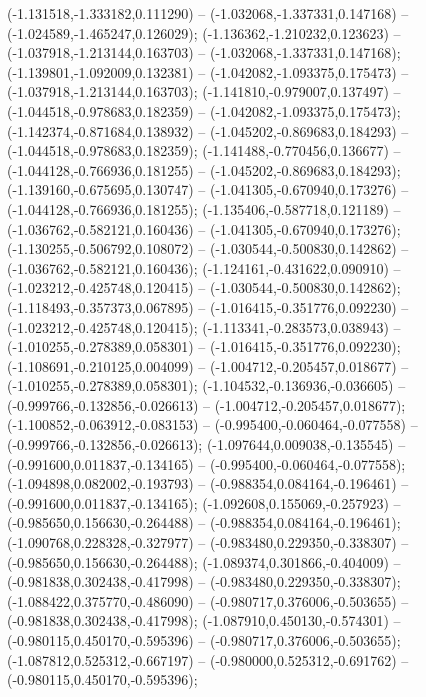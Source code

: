  (-1.131518,-1.333182,0.111290) -- (-1.032068,-1.337331,0.147168) -- (-1.024589,-1.465247,0.126029);
 (-1.136362,-1.210232,0.123623) -- (-1.037918,-1.213144,0.163703) -- (-1.032068,-1.337331,0.147168);
 (-1.139801,-1.092009,0.132381) -- (-1.042082,-1.093375,0.175473) -- (-1.037918,-1.213144,0.163703);
 (-1.141810,-0.979007,0.137497) -- (-1.044518,-0.978683,0.182359) -- (-1.042082,-1.093375,0.175473);
 (-1.142374,-0.871684,0.138932) -- (-1.045202,-0.869683,0.184293) -- (-1.044518,-0.978683,0.182359);
 (-1.141488,-0.770456,0.136677) -- (-1.044128,-0.766936,0.181255) -- (-1.045202,-0.869683,0.184293);
 (-1.139160,-0.675695,0.130747) -- (-1.041305,-0.670940,0.173276) -- (-1.044128,-0.766936,0.181255);
 (-1.135406,-0.587718,0.121189) -- (-1.036762,-0.582121,0.160436) -- (-1.041305,-0.670940,0.173276);
 (-1.130255,-0.506792,0.108072) -- (-1.030544,-0.500830,0.142862) -- (-1.036762,-0.582121,0.160436);
 (-1.124161,-0.431622,0.090910) -- (-1.023212,-0.425748,0.120415) -- (-1.030544,-0.500830,0.142862);
 (-1.118493,-0.357373,0.067895) -- (-1.016415,-0.351776,0.092230) -- (-1.023212,-0.425748,0.120415);
 (-1.113341,-0.283573,0.038943) -- (-1.010255,-0.278389,0.058301) -- (-1.016415,-0.351776,0.092230);
 (-1.108691,-0.210125,0.004099) -- (-1.004712,-0.205457,0.018677) -- (-1.010255,-0.278389,0.058301);
 (-1.104532,-0.136936,-0.036605) -- (-0.999766,-0.132856,-0.026613) -- (-1.004712,-0.205457,0.018677);
 (-1.100852,-0.063912,-0.083153) -- (-0.995400,-0.060464,-0.077558) -- (-0.999766,-0.132856,-0.026613);
 (-1.097644,0.009038,-0.135545) -- (-0.991600,0.011837,-0.134165) -- (-0.995400,-0.060464,-0.077558);
 (-1.094898,0.082002,-0.193793) -- (-0.988354,0.084164,-0.196461) -- (-0.991600,0.011837,-0.134165);
 (-1.092608,0.155069,-0.257923) -- (-0.985650,0.156630,-0.264488) -- (-0.988354,0.084164,-0.196461);
 (-1.090768,0.228328,-0.327977) -- (-0.983480,0.229350,-0.338307) -- (-0.985650,0.156630,-0.264488);
 (-1.089374,0.301866,-0.404009) -- (-0.981838,0.302438,-0.417998) -- (-0.983480,0.229350,-0.338307);
 (-1.088422,0.375770,-0.486090) -- (-0.980717,0.376006,-0.503655) -- (-0.981838,0.302438,-0.417998);
 (-1.087910,0.450130,-0.574301) -- (-0.980115,0.450170,-0.595396) -- (-0.980717,0.376006,-0.503655);
 (-1.087812,0.525312,-0.667197) -- (-0.980000,0.525312,-0.691762) -- (-0.980115,0.450170,-0.595396);
